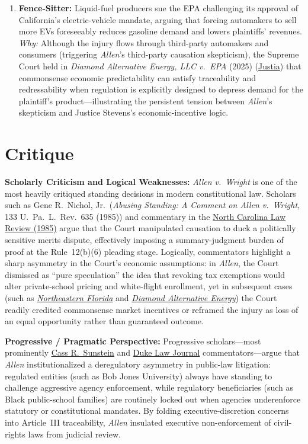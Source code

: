 \documentclass[12pt]{article}
\begin{document}
\begin{enumerate}
  \item \textbf{Fence-Sitter:} Liquid-fuel producers sue the EPA challenging its approval of California's electric-vehicle mandate, arguing that forcing automakers to sell more EVs foreseeably reduces gasoline demand and lowers plaintiffs' revenues. \textit{Why:} Although the injury flows through third-party automakers and consumers (triggering \textit{Allen}'s third-party causation skepticism), the Supreme Court held in \textit{Diamond Alternative Energy, LLC v.\ EPA} (2025) (\href{https://supreme.justia.com/cases/federal/us/606/24-7/}{Justia}) that commonsense economic predictability can satisfy traceability and redressability when regulation is explicitly designed to depress demand for the plaintiff's product---illustrating the persistent tension between \textit{Allen}'s skepticism and Justice Stevens's economic-incentive logic.
\end{enumerate}

\section{Critique}
\textbf{Scholarly Criticism and Logical Weaknesses:} \textit{Allen v.\ Wright} is one of the most heavily critiqued standing decisions in modern constitutional law. Scholars such as Gene R.\ Nichol, Jr.\ (\textit{Abusing Standing: A Comment on Allen v.\ Wright}, 133 U.\ Pa.\ L.\ Rev.\ 635 (1985)) and commentary in the \href{https://scholarship.law.unc.edu/cgi/viewcontent.cgi?article=2983&context=nclr}{North Carolina Law Review (1985)} argue that the Court manipulated causation to duck a politically sensitive merits dispute, effectively imposing a summary-judgment burden of proof at the Rule~12(b)(6) pleading stage. Logically, commentators highlight a sharp asymmetry in the Court's economic assumptions: in \textit{Allen}, the Court dismissed as ``pure speculation'' the idea that revoking tax exemptions would alter private-school pricing and white-flight enrollment, yet in subsequent cases (such as \href{https://supreme.justia.com/cases/federal/us/508/656/}{\textit{Northeastern Florida}} and \href{https://supreme.justia.com/cases/federal/us/606/24-7/}{\textit{Diamond Alternative Energy}}) the Court readily credited commonsense market incentives or reframed the injury as loss of an equal opportunity rather than guaranteed outcome.

\textbf{Progressive / Pragmatic Perspective:} Progressive scholars---most prominently \href{https://chicagounbound.uchicago.edu/context/journal_articles/article/12523/viewcontent/1458.pdf}{Cass R.\ Sunstein} and \href{https://scholarship.law.duke.edu/cgi/viewcontent.cgi?article=3221&context=dlj}{Duke Law Journal} commentators---argue that \textit{Allen} institutionalized a deregulatory asymmetry in public-law litigation: regulated entities (such as Bob Jones University) always have standing to challenge aggressive agency enforcement, while regulatory beneficiaries (such as Black public-school families) are routinely locked out when agencies underenforce statutory or constitutional mandates. By folding executive-discretion concerns into Article~III traceability, \textit{Allen} insulated executive non-enforcement of civil-rights laws from judicial review.
\end{document}
